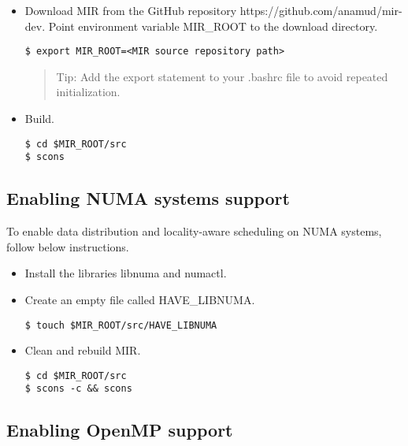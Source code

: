 \documentclass[11pt,a4paper]{article}
\begin{document}
\begin{itemize}
    \item Download MIR from the GitHub repository
        \textsf{https://github.com/anamud/mir-dev}. Point environment variable
        MIR\_ROOT to the download directory.

\begin{lstlisting}[style=MyInputStyle]
$ export MIR_ROOT=<MIR source repository path>
\end{lstlisting}

\begin{framed}
\begin{quote}
Tip: Add the export statement to your \textsf{.bashrc} file to avoid repeated initialization.
\end{quote}
\end{framed}

    \item Build.

\begin{lstlisting}[style=MyInputStyle]
$ cd $MIR_ROOT/src
$ scons
\end{lstlisting}
\end{itemize}

\subsection{Enabling NUMA systems support}\label{sec:enabling-numa-systems-support}

To enable data distribution and locality-aware scheduling on NUMA systems, follow below instructions.

\begin{itemize}
    \item Install the libraries libnuma and numactl.
    \item Create an empty file called \textsf{HAVE\_LIBNUMA}.

\begin{lstlisting}[style=MyInputStyle]
$ touch $MIR_ROOT/src/HAVE_LIBNUMA
\end{lstlisting}

    \item Clean and rebuild MIR.

\begin{lstlisting}[style=MyInputStyle]
$ cd $MIR_ROOT/src
$ scons -c && scons
\end{lstlisting}
\end{itemize}

\subsection{Enabling OpenMP support}\label{sec:enable-omp-support}
\end{document}
